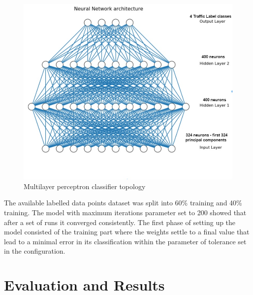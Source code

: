 \documentclass[12pt, a4paper]{report}
\theoremstyle{definition}
\theoremstyle{definition}%
\theoremstyle{definition}%
\theoremstyle{definition}%
\theoremstyle{definition}%
\theoremstyle{definition}%
\begin{document}
\begin{figure}[h]	
	\includegraphics[scale=0.50]{ann_topology.jpg}
	\centering
	\caption{Multilayer perceptron classifier topology }
	\label{fig:ann_topology}
\end{figure}
 


The available labelled data points dataset was split into 60\% training and 40\% training. The model with maximum iterations parameter set to 200 showed that after a set of runs it converged consistently. The first phase of setting up the model consisted of the training part where the weights settle to a final value that lead to a minimal error in its classification within the parameter of tolerance set in the configuration. 





\chapter{Evaluation and Results} \label{chapter:evaluation_and_results}
\end{document}
